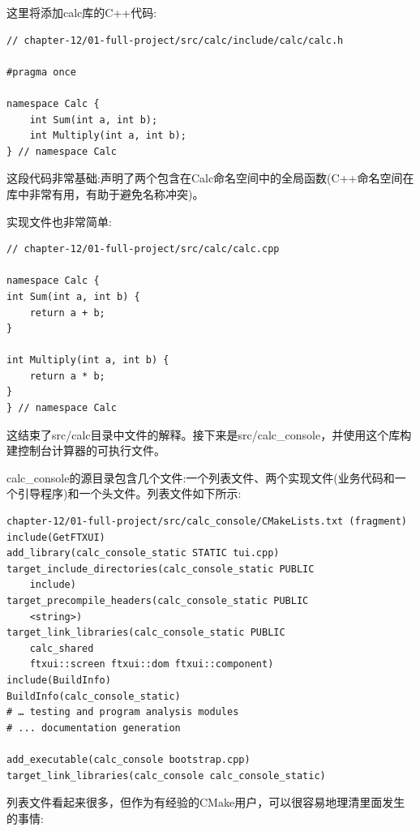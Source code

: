 这里将添加calc库的C++代码:

\begin{lstlisting}[style=styleCXX]
// chapter-12/01-full-project/src/calc/include/calc/calc.h

#pragma once

namespace Calc {
	int Sum(int a, int b);
	int Multiply(int a, int b);
} // namespace Calc
\end{lstlisting}

这段代码非常基础:声明了两个包含在Calc命名空间中的全局函数(C++命名空间在库中非常有用，有助于避免名称冲突)。

实现文件也非常简单:

\begin{lstlisting}[style=styleCXX]
// chapter-12/01-full-project/src/calc/calc.cpp

namespace Calc {
int Sum(int a, int b) {
	return a + b;
}

int Multiply(int a, int b) {
	return a * b;
}
} // namespace Calc
\end{lstlisting}

这结束了src/calc目录中文件的解释。接下来是src/calc\_console，并使用这个库构建控制台计算器的可执行文件。


calc\_console的源目录包含几个文件:一个列表文件、两个实现文件(业务代码和一个引导程序)和一个头文件。列表文件如下所示:

\begin{lstlisting}[style=styleCMake]
chapter-12/01-full-project/src/calc_console/CMakeLists.txt (fragment)
include(GetFTXUI)
add_library(calc_console_static STATIC tui.cpp)
target_include_directories(calc_console_static PUBLIC
	include)
target_precompile_headers(calc_console_static PUBLIC
	<string>)
target_link_libraries(calc_console_static PUBLIC
	calc_shared
	ftxui::screen ftxui::dom ftxui::component)
include(BuildInfo)
BuildInfo(calc_console_static)
# … testing and program analysis modules
# ... documentation generation

add_executable(calc_console bootstrap.cpp)
target_link_libraries(calc_console calc_console_static)
\end{lstlisting}

列表文件看起来很多，但作为有经验的CMake用户，可以很容易地理清里面发生的事情:

